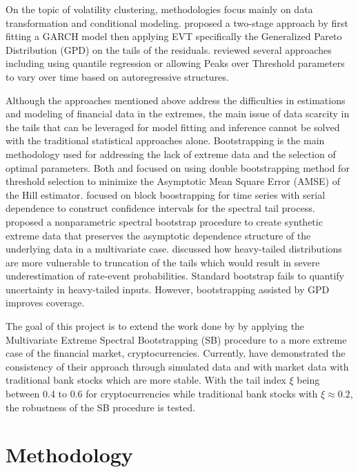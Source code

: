 \documentclass[a4paper,11pt]{article}
\begin{document}
On the topic of volatility clustering, methodologies focus mainly on data transformation and conditional modeling.
\textcite{mcneil2000estimation} proposed a two-stage approach by first fitting a GARCH model then applying EVT specifically the Generalized Pareto Distribution (GPD) on the tails of the residuals.
\textcite{bee2018estimating} reviewed several approaches including using quantile regression or allowing Peaks over Threshold parameters to vary over time based on autoregressive structures.

Although the approaches mentioned above address the difficulties in estimations and modeling of financial data in the extremes,
the main issue of data scarcity in the tails that can be leveraged for model fitting and inference cannot be solved with the traditional statistical approaches alone.
Bootstrapping is the main methodology used for addressing the lack of extreme data and the selection of optimal parameters.
Both \textcite{qi2008bootstrap} and \textcite{gomes2012adaptive} focused on using double bootstrapping method for threshold selection to minimize the Asymptotic Mean Square Error (AMSE) of the Hill estimator.
\textcite{davis2018inference} focused on block boostrapping for time series with serial dependence to construct confidence intervals for the spectral tail process.
\textcite{madhar2025spectral} proposed a nonparametric spectral bootstrap procedure to create synthetic extreme data that preserves the asymptotic dependence structure of the underlying data in a multivariate case.
\textcite{huang2023propagation} discussed how heavy-tailed distributions are more vulnerable to truncation of the tails which would result in severe underestimation of rate-event probabilities.
Standard bootstrap fails to quantify uncertainty in heavy-tailed inputs. However, bootstrapping assisted by GPD improves coverage.

The goal of this project is to extend the work done by \textcite{madhar2025spectral} by applying the Multivariate Extreme Spectral Bootstrapping (SB) procedure to a more extreme case of the financial market, cryptocurrencies.
Currently, \textcite{madhar2025spectral} have demonstrated the consistency of their approach through simulated data and with market data with traditional bank stocks which are more stable.
With the tail index $\xi$ being between 0.4 to 0.6 for cryptocurrencies while traditional bank stocks with $\xi \approx 0.2$, the robustness of the SB procedure is tested. 

\section{Methodology}
\end{document}

